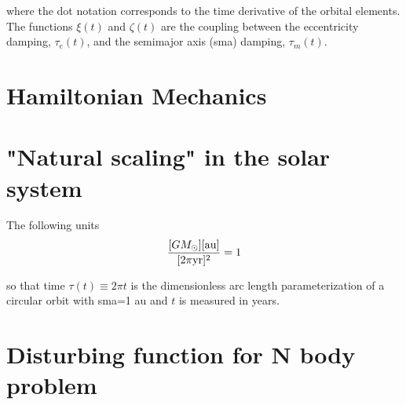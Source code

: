 \documentclass[11pt]{article}
\begin{document}
\noindent
where the dot notation corresponds to the time derivative of the
orbital elements. The functions \(\xi(t)\) and \(\zeta(t)\) are the
coupling between the eccentricity damping, \(\tau_e(t)\), and the
semimajor axis (sma) damping, \(\tau_m(t)\).

\section{Hamiltonian Mechanics}
\label{sec:orga72c4e2}
\section{"Natural scaling" in the solar system}
\label{sec:org467b0cf}
The following units
\begin{align}
\frac{[GM_\odot][{\rm au}]}{[2\pi{\rm yr}]^2} = 1
\end{align}

\noindent so that time \(\tau(t) \equiv 2\pi t\) is the
dimensionless arc length parameterization of a circular orbit
with sma=1 au and \(t\) is measured in years.
\section{Disturbing function for N body problem}
\label{sec:orgc5e72c2}
\end{document}
